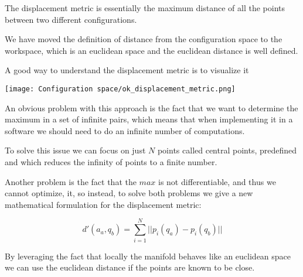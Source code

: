 The displacement metric is essentially the maximum distance of all the points between two different configurations.

\begin{tipbox}
    We have moved the definition of distance from the configuration space to the workspace, which is an euclidean space and the euclidean distance is well defined.
\end{tipbox}

A good way to understand the displacement metric is to visualize it

\begin{center}
    \texttt{[image: Configuration space/ok\_displacement\_metric.png]}
\end{center}

An obvious problem with this approach is the fact that we want to determine the maximum in a set of infinite pairs, which means that when implementing it in a software we should need to do an infinite number of computations.

To solve this issue we can focus on just $N$ points called central points, predefined and which reduces the infinity of points to a finite number.

Another problem is the fact that the $max$ is not differentiable, and thus we cannot optimize, it, so instead, to solve both problems we give a new mathematical formulation for the displacement metric:

$$
    d'(a_a,q_b) = \sum_{i=1}^N || p_i(q_a) - p_i(q_b)||
$$

\begin{warningbox}
    By leveraging the fact that locally the manifold behaves like an euclidean space we can use the euclidean distance if the points are known to be close.
\end{warningbox}